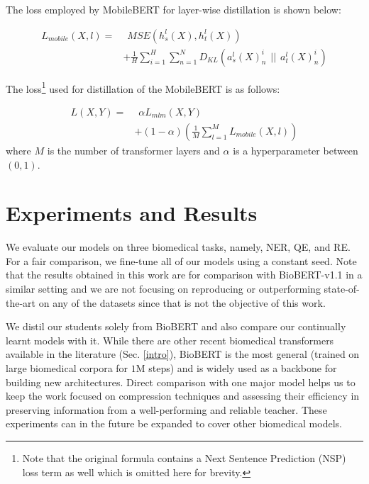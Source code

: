 \documentclass{article}
\begin{document}
The loss employed by MobileBERT for layer-wise distillation is shown below: 

\begin{align} \label{eq:12}
    L_{mobile}(X, l) =  & \hspace{5pt} MSE(h_s^l(X) , h_t^{l}(X))\\
                        & + \frac{1}{H}\sum^H_{i=1} \sum^{N}_{n=1} D_{KL}(a_s^l(X)^i_n \hspace{5pt} || \hspace{5pt} a_t^{l}(X)^i_n) \nonumber \nonumber
\end{align}

The {loss}\footnote{Note that the original formula contains a Next Sentence Prediction (NSP) loss term as well which is omitted here for brevity.} used for distillation of the MobileBERT is as follows:

\begin{align}
    L(X , Y) = &\hspace{5pt}\alpha L_{mlm}(X , Y) \\
               & + (1 - \alpha)(\frac{1}{M}\sum_{l=1}^M L_{mobile}(X,l)) \nonumber
\end{align}
where $M$ is the number of transformer layers and  $\alpha$ is a hyperparameter between $(0 , 1)$.


\section{Experiments and Results}

We evaluate our models on three biomedical tasks, namely, NER, QE, and RE. For a fair comparison, we fine-tune all of our models using a constant seed. Note that the results obtained in this work are for comparison with BioBERT-v1.1 in a similar setting and we are not focusing on reproducing or outperforming state-of-the-art on any of the datasets since that is not the objective of this work. 

We distil our students solely from BioBERT and also compare our continually learnt models with it. While there are other recent biomedical transformers available in the literature (Sec. \ref{intro}), BioBERT is the most general (trained on large biomedical corpora for $1$M steps) and is widely used as a backbone for building new architectures. Direct comparison with one major model helps us to keep the work focused on compression techniques and assessing their efficiency in preserving information from a well-performing and reliable teacher. These experiments can in the future be expanded to cover other biomedical models.    
\end{document}
